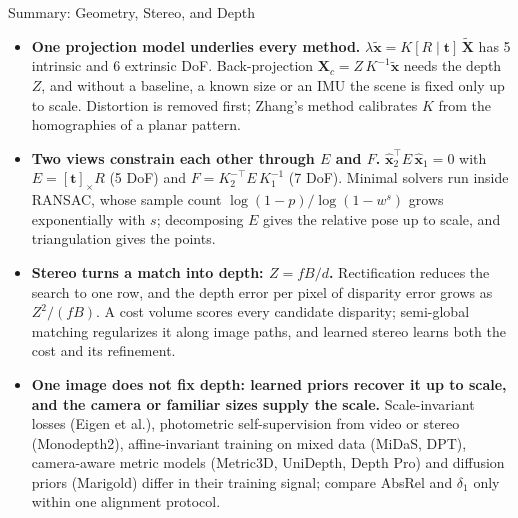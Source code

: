 \begin{frame}{Summary: Geometry, Stereo, and Depth}
  \begin{itemize}\footnotesize\itemsep0.45em
    \item \textbf{One projection model underlies every method.} $\lambda\tilde{\mathbf{x}}=K[R\mid\mathbf{t}]\,\tilde{\mathbf{X}}$ has 5 intrinsic and 6 extrinsic DoF. Back-projection $\mathbf{X}_c=Z\,K^{-1}\tilde{\mathbf{x}}$ needs the depth $Z$, and without a baseline, a known size or an IMU the scene is fixed only up to scale. Distortion is removed first; Zhang's method calibrates $K$ from the homographies of a planar pattern.
    \item \textbf{Two views constrain each other through $E$ and $F$.} $\hat{\mathbf{x}}_2^\top E\,\hat{\mathbf{x}}_1=0$ with $E=[\mathbf{t}]_\times R$ (5 DoF) and $F=K_2^{-\top}E\,K_1^{-1}$ (7 DoF). Minimal solvers run inside RANSAC, whose sample count $\log(1-p)/\log(1-w^s)$ grows exponentially with $s$; decomposing $E$ gives the relative pose up to scale, and triangulation gives the points.
    \item \textbf{Stereo turns a match into depth: $Z=fB/d$.} Rectification reduces the search to one row, and the depth error per pixel of disparity error grows as $Z^2/(fB)$. A cost volume scores every candidate disparity; semi-global matching regularizes it along image paths, and learned stereo learns both the cost and its refinement.
    \item \textbf{One image does not fix depth: learned priors recover it up to scale, and the camera or familiar sizes supply the scale.} Scale-invariant losses (Eigen et al.), photometric self-supervision from video or stereo (Monodepth2), affine-invariant training on mixed data (MiDaS, DPT), camera-aware metric models (Metric3D, UniDepth, Depth Pro) and diffusion priors (Marigold) differ in their training signal; compare AbsRel and $\delta_1$ only within one alignment protocol.
  \end{itemize}
\end{frame}

